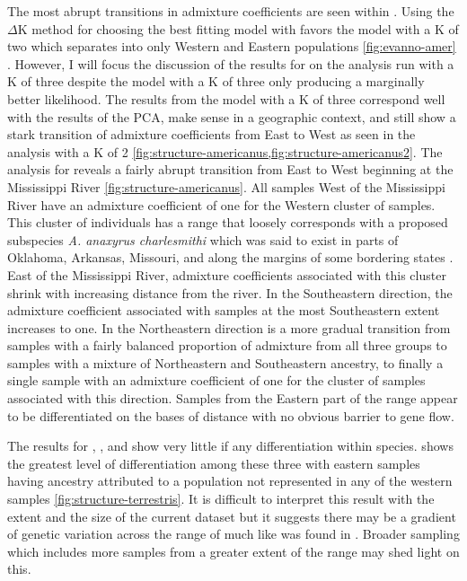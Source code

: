 The most abrupt transitions in admixture coefficients are seen within \amer.
Using the $\Delta$K method for choosing the best fitting \structure model with \amer 
favors the model with a K of two which separates \amer into only Western and Eastern
populations \cref{fig:evanno-amer} \parencite{evanno2005}. 
However, I will focus the discussion of the \structure results for \amer on the 
analysis run with a K of three despite the model with a K of three only 
producing a marginally better likelihood. 
The results from the model with a K of three correspond well with the results of 
the PCA, make sense in a geographic context, and still show a stark 
transition of admixture coefficients from East to West as seen in the analysis 
with a K of 2 \cref{fig:structure-americanus,fig:structure-americanus2}.
The \structure analysis for \amer reveals a fairly abrupt transition from East
to West beginning at the Mississippi River \cref{fig:structure-americanus}.
All samples West of the Mississippi River have an admixture coefficient of one for the 
Western cluster of samples.
This cluster of individuals has a range that loosely corresponds with a proposed
subspecies \textit{A. anaxyrus charlesmithi} which was said to exist in parts  
of Oklahoma, Arkansas, Missouri, and along the margins of some bordering states 
\parencite{bragg1954}.
East of the Mississippi River, admixture coefficients associated with this cluster
shrink with increasing distance from the river. 
In the Southeastern direction, the admixture coefficient associated with samples
at the most Southeastern extent increases to one.
In the Northeastern direction is a more gradual transition from samples with 
a fairly balanced proportion of admixture from all three groups to samples  
with a mixture of Northeastern and Southeastern ancestry, to finally a single
sample with an admixture coefficient of one for the cluster of samples associated
with this direction.
Samples from the Eastern part of the \amer range appear to be differentiated 
on the bases of distance with no obvious barrier to gene flow. 

The \structure results for \fowl, \terr, and \wood show very little if any
differentiation within species.
\terr shows the greatest level of differentiation among these three with 
eastern samples having ancestry attributed to a population not represented 
in any of the western samples \cref{fig:structure-terrestris}. 
It is difficult to interpret this result with the extent and the size of the 
current dataset but it suggests there may be a gradient of genetic variation
across the range of \terr much like was found in \amer. 
Broader sampling which includes more samples from a greater extent of the \terr
range may shed light on this.  

